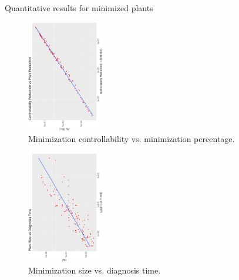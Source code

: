 \begin{table}
	\resizebox{\textwidth}{!} {

}
  \caption{Quantitative results for minimized plants}
  \label{table:quantitative-results}
 \end{table}
\begin{figure}[bt]
	\centering
	\SmallPicture
\includegraphics[width=0.3\textwidth, angle=-90]{../experimental_setting/tmp_results/min_ctrl_vs_min_pct.ps}
	\vspace*{-2mm}
	\caption{Minimization controllability vs. minimization percentage.}
	\label{fig:min_ctr_vs_min_pct}
	\vspace*{-4mm}
	\MediumPicture
\end{figure}
\begin{figure}[bt]
	\centering
	\SmallPicture
	\includegraphics[width=0.3\textwidth, angle=-90]{../experimental_setting/tmp_results/size_vs_diag_time.ps}
	\vspace*{-2mm}
	\caption{Minimization size vs. diagnosis time.}
	\label{fig:size_vs_diag_time}
	\vspace*{-4mm}
	\MediumPicture
\end{figure}



